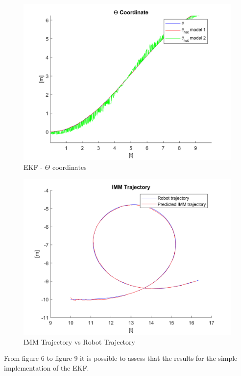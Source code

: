 \documentclass[conference]{IEEEtran}
\begin{document}
\bigskip \bigskip \bigskip \bigskip \bigskip \bigskip \bigskip \bigskip \bigskip \bigskip \bigskip \bigskip \bigskip \bigskip \bigskip \bigskip 
\begin{figure}[H]
 \includegraphics[width=\linewidth]{dwg/t-coord.png}
  \caption{EKF - $\Theta$ coordinates}
 
\end{figure}

\begin{figure}[H]
 \includegraphics[width=\linewidth]{dwg/IMM-trj.png}
  \caption{IMM Trajectory vs Robot Trajectory}
  \label{fig:second}
\end{figure}

From figure 6 to figure 9 it is possible to assess that the results for the simple implementation of the EKF.
\end{document}
